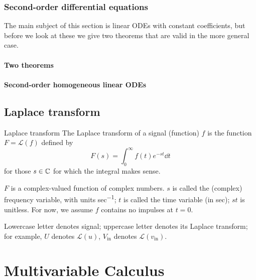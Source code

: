 \subsection{Second-order differential equations}
The main subject of this section is linear ODEs with constant coefficients, but before we look at these we give two theorems that are valid in the more general case.

\subsubsection{Two theorems}


\subsubsection{Second-order homogeneous linear ODEs}

\pagebreak

\section{Laplace transform}
\begin{defn}{Laplace transform}{}
The Laplace transform of a signal (function) $f$ is the function $F = \mathcal{L}(f)$ defined by
\begin{equation}
F(s) = \int_0^\infty f(t)e^{-st} \dd{t}
\end{equation}
for those $s \in \mathbb C$ for which the integral makes sense.
\end{defn}

\begin{remark}
$F$ is a complex-valued function of complex numbers. $s$ is called the (complex) frequency variable, with units \unit{sec^{-1}}; $t$ is called the time variable (in \unit{sec}); $st$ is unitless. For now, we assume $f$ contains no impulses at $t = 0$.
\end{remark}

\begin{notation}
Lowercase letter denotes signal; uppercase letter denotes its Laplace transform; for example, $U$ denotes $\mathcal{L}(u)$, $V_\text{in}$ denotes $\mathcal{L}(v_\text{in})$.
\end{notation}


\chapter{Multivariable Calculus}

